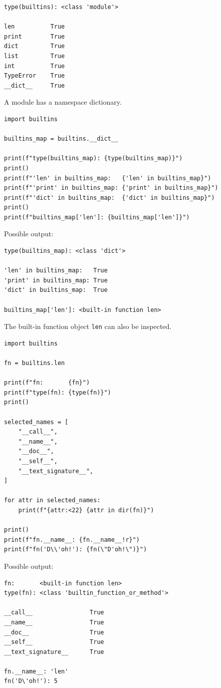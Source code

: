 \begin{verbatim}
type(builtins): <class 'module'>

len          True
print        True
dict         True
list         True
int          True
TypeError    True
__dict__     True
\end{verbatim}

A module has a namespace dictionary.

\begin{verbatim}
import builtins

builtins_map = builtins.__dict__

print(f"type(builtins_map): {type(builtins_map)}")
print()
print(f"'len' in builtins_map:   {'len' in builtins_map}")
print(f"'print' in builtins_map: {'print' in builtins_map}")
print(f"'dict' in builtins_map:  {'dict' in builtins_map}")
print()
print(f"builtins_map['len']: {builtins_map['len']}")
\end{verbatim}

Possible output:

\begin{verbatim}
type(builtins_map): <class 'dict'>

'len' in builtins_map:   True
'print' in builtins_map: True
'dict' in builtins_map:  True

builtins_map['len']: <built-in function len>
\end{verbatim}

The built-in function object \texttt{len} can also be inspected.

\begin{verbatim}
import builtins

fn = builtins.len

print(f"fn:       {fn}")
print(f"type(fn): {type(fn)}")
print()

selected_names = [
    "__call__",
    "__name__",
    "__doc__",
    "__self__",
    "__text_signature__",
]

for attr in selected_names:
    print(f"{attr:<22} {attr in dir(fn)}")

print()
print(f"fn.__name__: {fn.__name__!r}")
print(f"fn('D\\'oh!'): {fn(\"D'oh!\")}")
\end{verbatim}

Possible output:

\begin{verbatim}
fn:       <built-in function len>
type(fn): <class 'builtin_function_or_method'>

__call__                True
__name__                True
__doc__                 True
__self__                True
__text_signature__      True

fn.__name__: 'len'
fn('D\'oh!'): 5
\end{verbatim}


